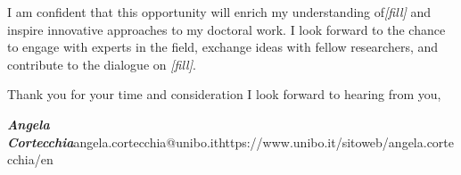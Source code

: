 \documentclass[12pt,letterpaper]{letter} %
\makeatletter
\def\Who{Angela Cortecchia} %
\def\Email{angela.cortecchia@unibo.it} %
\def\URL{https://www.unibo.it/sitoweb/angela.cortecchia/en}
\makeatother
\begin{document}
I am confident that this opportunity will enrich my understanding of\textit{[fill]} 
and inspire innovative approaches to my doctoral work. 
%
I look forward to the chance to engage with experts in the field, 
exchange ideas with fellow researchers, 
and contribute to the dialogue on \textit{[fill]}. 


Thank you for your time and consideration
I look forward to hearing from you,

\textbf{\emph{\Who{}}}\newline \Email\newline \small{\URL}





\end{document}
